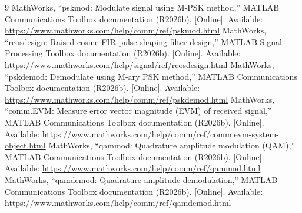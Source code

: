 \documentclass[11pt]{article}
\begin{document}
\begin{thebibliography}{9}
     MathWorks, ``pskmod: Modulate signal using M-PSK method,'' MATLAB Communications Toolbox documentation (R2026b). [Online]. Available: \url{https://www.mathworks.com/help/comm/ref/pskmod.html}
     MathWorks, ``rcosdesign: Raised cosine FIR pulse-shaping filter design,'' MATLAB Signal Processing Toolbox documentation (R2026b). [Online]. Available: \url{https://www.mathworks.com/help/signal/ref/rcosdesign.html}
     MathWorks, ``pskdemod: Demodulate using M-ary PSK method,'' MATLAB Communications Toolbox documentation (R2026b). [Online]. Available: \url{https://www.mathworks.com/help/comm/ref/pskdemod.html}
     MathWorks, ``comm.EVM: Measure error vector magnitude (EVM) of received signal,'' MATLAB Communications Toolbox documentation (R2026b). [Online]. Available: \url{https://www.mathworks.com/help/comm/ref/comm.evm-system-object.html}
     MathWorks, ``qammod: Quadrature amplitude modulation (QAM),'' MATLAB Communications Toolbox documentation (R2026b). [Online]. Available: \url{https://www.mathworks.com/help/comm/ref/qammod.html}
     MathWorks, ``qamdemod: Quadrature amplitude demodulation,'' MATLAB Communications Toolbox documentation (R2026b). [Online]. Available: \url{https://www.mathworks.com/help/comm/ref/qamdemod.html}
\end{thebibliography}
\end{document}
